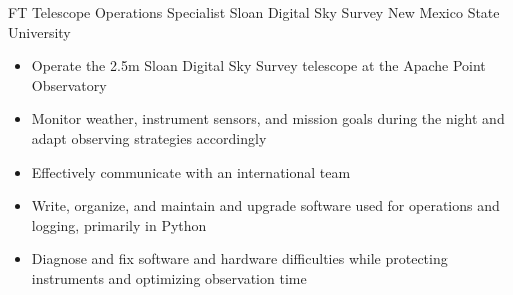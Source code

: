     {FT} %
    {Telescope Operations Specialist} %
    {Sloan Digital Sky Survey} %
    {New Mexico State University}
    {\begin{itemize}
    \setlength\itemsep{0.1em} 
        \item Operate the 2.5m Sloan Digital Sky Survey telescope at the Apache
            Point Observatory
        \item Monitor weather, instrument sensors, and mission goals during the
            night and adapt observing strategies accordingly
        \item Effectively communicate with an international team
        \item Write, organize, and maintain and upgrade software used
            for operations and logging, primarily in Python
        \item Diagnose and fix software and hardware
            difficulties while protecting instruments and optimizing observation
            time
    \end{itemize}
}
